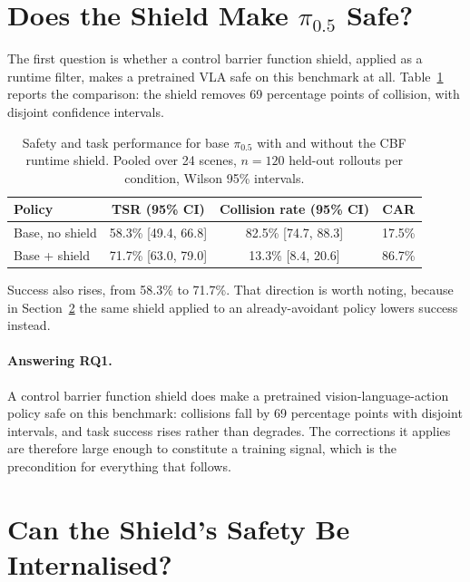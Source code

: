 \documentclass[a4paper,11pt]{report}
\begin{document}
\section{Does the Shield Make \texorpdfstring{$\pi_{0.5}$}{pi 0.5} Safe?}\label{sec:shield_efficacy}

The first question is whether a control barrier function shield, applied as a runtime filter, makes
a pretrained VLA safe on this benchmark at all. Table~\ref{tab:shield_efficacy} reports the
comparison: the shield removes 69 percentage points of collision, with disjoint confidence
intervals.

\begin{table}[htbp]
\centering
\caption{Safety and task performance for base $\pi_{0.5}$ with and without the CBF runtime shield.
  Pooled over 24 scenes, $n = 120$ held-out rollouts per condition, Wilson 95\% intervals.}
\label{tab:shield_efficacy}
\begin{tabular}{lccc}
\toprule
\textbf{Policy} & \textbf{TSR (95\% CI)} & \textbf{Collision rate (95\% CI)} & \textbf{CAR} \\
\midrule
Base, no shield & 58.3\% [49.4, 66.8] & 82.5\% [74.7, 88.3] & 17.5\% \\
Base + shield   & 71.7\% [63.0, 79.0] & 13.3\% [\phantom{0}8.4, 20.6] & 86.7\% \\
\bottomrule
\end{tabular}
\end{table}

Success also rises, from 58.3\% to 71.7\%. That direction is worth noting, because in
Section~\ref{sec:res:internalise} the same shield applied to an already-avoidant policy lowers
success instead.

\paragraph{Answering RQ1.}
A control barrier function shield does make a pretrained vision-language-action policy safe on this
benchmark: collisions fall by 69 percentage points with disjoint intervals, and task success rises
rather than degrades. The corrections it applies are therefore large enough to constitute a
training signal, which is the precondition for everything that follows.

\section{Can the Shield's Safety Be Internalised?}\label{sec:res:internalise}
\end{document}
